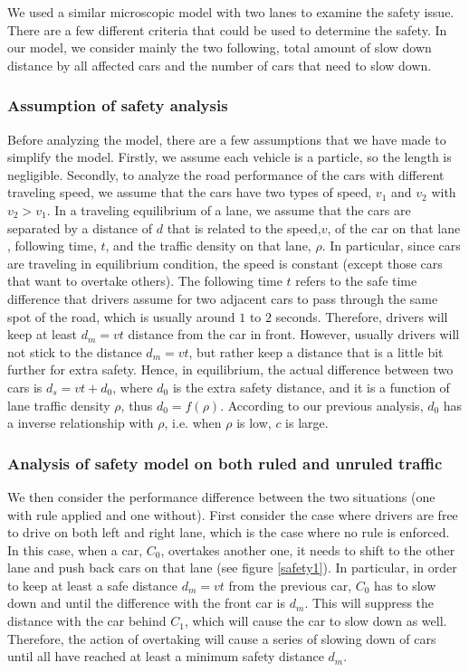 We used a similar microscopic model with two lanes to examine the safety issue. There are a few different criteria that could be used to determine the safety. In our model, we consider mainly the two following, total amount of slow down distance by all affected cars and the number of cars that need to slow down. 

\subsubsection{Assumption of safety analysis}

Before analyzing the model, there are a few assumptions that we have made to simplify the model. Firstly, we assume each vehicle is a particle, so the length is negligible. Secondly, to analyze the road performance of the cars with different traveling speed, we assume that the cars have two types of speed, $v_1$ and $v_2$ with $v_2 > v_1$. In a traveling equilibrium of a lane, we assume that the cars are separated by a distance of $d$ that is related to the speed,$v$, of the car on that lane , following time, $t$, and the traffic density on that lane, $\rho$. In particular, since cars are traveling in equilibrium condition, the speed is constant (except those cars that want to overtake others). The following time $t$ refers to the safe time difference that drivers assume for two adjacent cars to pass through the same spot of the road, which is usually around $1$ to $2$ seconds. Therefore, drivers will keep at least $d_m = vt$ distance from the car in front. However, usually drivers will not stick to the distance $d_m = vt$, but rather keep a distance that is a little bit further for extra safety. Hence, in equilibrium, the actual difference between two cars is $d_s = vt + d_0$, where $d_0$ is the extra safety distance, and it is a function of lane traffic density $\rho$, thus $d_0 = f(\rho)$. According to our previous analysis, $d_0$ has a inverse relationship with $\rho$, i.e. when $\rho$ is low, $c$ is large.

\subsubsection{Analysis of safety model on both ruled and unruled traffic}

We then consider the performance difference between the two situations (one with rule applied and one without). First consider the case where drivers are free to drive on both left and right lane, which is the case where no rule is enforced. In this case, when a car, $C_0$, overtakes another one, it needs to shift to the other lane and push back cars on that lane (see figure \ref{safety1}). In particular, in order to keep at least a safe distance $d_m = vt$ from the previous car, $C_0$ has to slow down and until the difference with the front car is $d_m$. This will suppress the distance with the car behind $C_1$, which will cause the car to slow down as well. Therefore, the action of overtaking will cause a series of slowing down of cars until all have reached at least a minimum safety distance $d_m$. 

